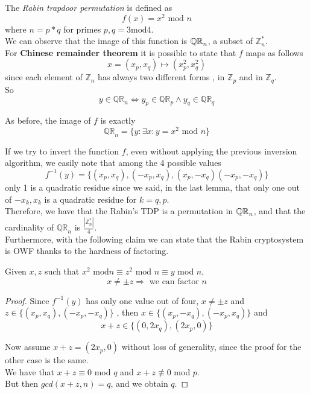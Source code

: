 The \textit{Rabin trapdoor permutation} is defined as 
\[
    f(x)=x^{2} \text{ mod } n
\]
where $n=p*q$ for primes $p,q=3 \text{mod} 4$.\\

We can observe that the image of this function is $\QR[n]$, a subset of $
\mathbb{Z}^{*}_{n} $.\\

For \textbf{Chinese remainder theorem} it is possible to state that $f$ maps
as follows
\[
    x= (x_{p}, x_{q}) \mapsto (x^{2}_{p}, x^{2}_{q})
\]
since each element of $ \mathbb{Z}_n$ has always two different forms , in $
\mathbb{Z}_{p} $ and in $ \mathbb{Z}_{q} $.\\

So
\[
y \in  \mathbb{QR}_{n} \Leftrightarrow y_{p} \in \mathbb{QR}_{p} \wedge y_{q} \in
\mathbb{QR}_{q} 
\]

As before, the image of $f$ is exactly
\[
    \mathbb{QR}_{n} = \{ y: \exists x : y=x^{2} \text{ mod } n\}
\]

If we try to invert the function $f$, even without applying the previous
inversion algorithm, we easily note that among the 4 possible values
\[
    f^{-1}(y)=\{ (x_{p}, x_{q}),(-x_{p}, x_{q}),(x_{p},- x_{q})(-x_{p},- x_{q})\}
\]\label{les15:outoffour}
only 1 is a quadratic residue since we said, in the
last lemma, that only one out of
$-x_{k}, x_{k}$ is a quadratic residue for $k=q,p$.\\

Therefore, we have that the Rabin's TDP is a permutation in $\QR[n]$, and that the
cardinality of $ \mathbb{QR}_{n} $ is $\frac{|\mathbb{Z}^{*}_{n} |}{4}$.\\

Furthermore, with the following claim we can state that the Rabin cryptosystem
is OWF thanks to the hardness of factoring.

\begin{claim}
    Given $x, z$ such that $x^{2}\text{ mod} n \equiv z^{2} \text{ mod } n
    \equiv y$ mod $n$,
\[
    x\not= \pm z \Rightarrow \text{ we can factor } n
\]
\end{claim}
\begin{proof}
    Since $f^{-1}(y)$ has only one value out of four, $x\neq \pm z$ and
    $z\in \{(x_{p},x_{q}),(-x_{p},-x_{q})\}$ , then
    $x \in \{(x_{p},-x_{q}),(-x_{p},x_{q})\}$ and 
    \[
        x + z \in \{(0,2x_{q}), (2x_{p}, 0)\}
    \]

    Now assume $x + z = (2x_{p}, 0)$ without loss of generality, since the proof
    for the other case is the same.\\
    We have that $x+z \equiv 0$ mod $q$ and $x+z \not\equiv 0 $ mod $p$.\\

    But then $gcd( x+z , n)=q$, and we obtain $q$.
\end{proof}

